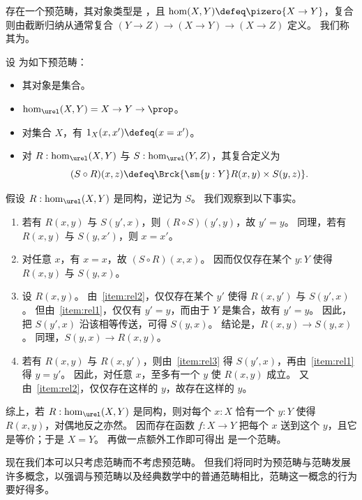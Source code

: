 \begin{eg}\label{ct:hoprecat}
  存在一个预范畴，其对象类型是 \type，且 $\hom(X,Y) \defeq \pizero{X\to Y}$，复合则由截断归纳从通常复合 $(Y\to Z) \to (X\to Y) \to (X\to Z)$ 定义。
  我们称其为。
\end{eg}

\begin{eg}\label{ct:rel}
  设 \urel 为如下预范畴：
  \begin{itemize}
  \item 其对象是集合。
  \item $\hom_{\urel}(X,Y) = X\to Y\to \prop$。
  \item 对集合 $X$，有 $1_X(x,x') \defeq (x=x')$。
  \item 对 $R:\hom_{\urel}(X,Y)$ 与 $S:\hom_{\urel}(Y,Z)$，其复合定义为
    \[ (S\circ R)(x,z) \defeq \Brck{\sm{y:Y} R(x,y) \times S(y,z)}.\]
  \end{itemize}
  假设 $R:\hom_{\urel}(X,Y)$ 是同构，逆记为 $S$。
  我们观察到以下事实。
  \begin{enumerate}
  \item 若有 $R(x,y)$ 与 $S(y',x)$，则 $(R\circ S)(y',y)$，故 $y'=y$。
    同理，若有 $R(x,y)$ 与 $S(y,x')$，则 $x=x'$。\label{item:rel1}
  \item 对任意 $x$，有 $x=x$，故 $(S\circ R)(x,x)$。
    因而仅仅存在某个 $y:Y$ 使得 $R(x,y)$ 与 $S(y,x)$。\label{item:rel2}
  \item 设 $R(x,y)$。
    由~\ref{item:rel2}，仅仅存在某个 $y'$ 使得 $R(x,y')$ 与 $S(y',x)$。
    但由~\ref{item:rel1}，仅仅有 $y'=y$，而由于 $Y$ 是集合，故有 $y'=y$。
    因此，把 $S(y',x)$ 沿该相等传送，可得 $S(y,x)$。
    结论是，$R(x,y)\to S(y,x)$。
    同理，$S(y,x) \to R(x,y)$。\label{item:rel3}
  \item 若有 $R(x,y)$ 与 $R(x,y')$，则由~\ref{item:rel3} 得 $S(y',x)$，再由~\ref{item:rel1} 得 $y=y'$。
    因此，对任意 $x$，至多有一个 $y$ 使 $R(x,y)$ 成立。
    又由~\ref{item:rel2}，仅仅存在这样的 $y$，故存在这样的 $y$。
  \end{enumerate}
  综上，若 $R:\hom_{\urel}(X,Y)$ 是同构，则对每个 $x:X$ 恰有一个 $y:Y$ 使得 $R(x,y)$，对偶地反之亦然。
  因而存在函数 $f:X\to Y$ 把每个 $x$ 送到这个 $y$，且它是等价；于是 $X=Y$。
  再做一点额外工作即可得出 \urel 是一个范畴。
\end{eg}

现在我们本可以只考虑范畴而不考虑预范畴。
但我们将同时为预范畴与范畴发展许多概念，以强调与预范畴以及经典数学中的普通范畴相比，范畴这一概念的行为要好得多。

